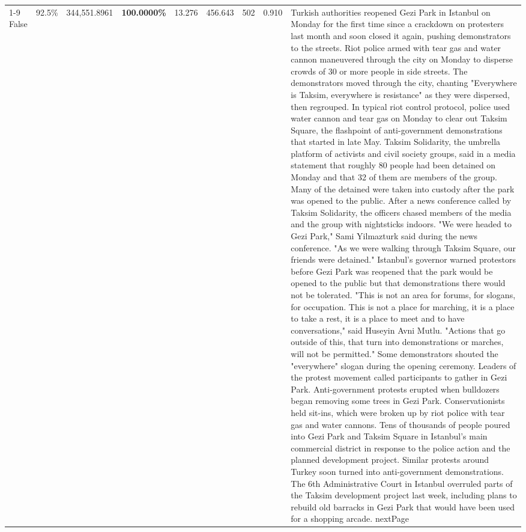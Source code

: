 \begin{table}[H]
\begin{tabular}{lllrlllll}
\cline{1-9}
False & 92.5\% & 344,551.8961 & \bfseries \color{red} 100.0000\% & 13.276 & 456.643 & 502 & 0.910 & Turkish authorities reopened Gezi Park in Istanbul on Monday for the first time since a crackdown on protesters last month and soon closed it again, pushing demonstrators to the streets. Riot police armed with tear gas and water cannon maneuvered through the city on Monday to disperse crowds of 30 or more people in side streets. The demonstrators moved through the city, chanting "Everywhere is Taksim, everywhere is resistance" as they were dispersed, then regrouped. In typical riot control protocol, police used water cannon and tear gas on Monday to clear out Taksim Square, the flashpoint of anti-government demonstrations that started in late May. Taksim Solidarity, the umbrella platform of activists and civil society groups, said in a media statement that roughly 80 people had been detained on Monday and that 32 of them are members of the group. Many of the detained were taken into custody after the park was opened to the public. After a news conference called by Taksim Solidarity, the officers chased members of the media and the group with nightsticks indoors. "We were headed to Gezi Park," Sami Yilmazturk said during the news conference. "As we were walking through Taksim Square, our friends were detained." Istanbul's governor warned protestors before Gezi Park was reopened that the park would be opened to the public but that demonstrations there would not be tolerated. "This is not an area for forums, for slogans, for occupation. This is not a place for marching, it is a place to take a rest, it is a place to meet and to have conversations," said Huseyin Avni Mutlu. "Actions that go outside of this, that turn into demonstrations or marches, will not be permitted." Some demonstrators shouted the "everywhere" slogan during the opening ceremony. Leaders of the protest movement called participants to gather in Gezi Park. Anti-government protests erupted when bulldozers began removing some trees in Gezi Park. Conservationists held sit-ins, which were broken up by riot police with tear gas and water cannons. Tens of thousands of people poured into Gezi Park and Taksim Square in Istanbul's main commercial district in response to the police action and the planned development project. Similar protests around Turkey soon turned into anti-government demonstrations. The 6th Administrative Court in Istanbul overruled parts of the Taksim development project last week, including plans to rebuild old barracks in Gezi Park that would have been used for a shopping arcade. nextPage \\

\end{tabular}
\end{table}
